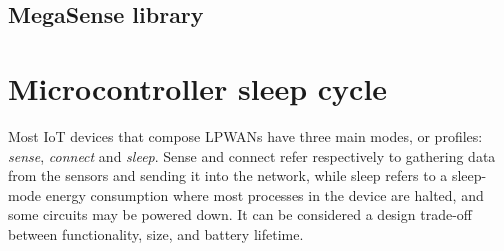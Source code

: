 		
		
		
		
		
		
		
%	
%		
%	

		\subsection{MegaSense library}\label{subsec:megasense_lib}
		
	\section{Microcontroller sleep cycle}\label{sec:sleep}
	
		Most IoT devices that compose LPWANs have three main modes, or profiles: \textit{sense}, \textit{connect} and \textit{sleep}.
		Sense and connect refer respectively to gathering data from the sensors and sending it into the network, while sleep refers to a sleep-mode energy consumption where most processes in the device are halted, and some circuits may be powered down.
		It can be considered a design trade-off between functionality, size, and battery lifetime.
		
